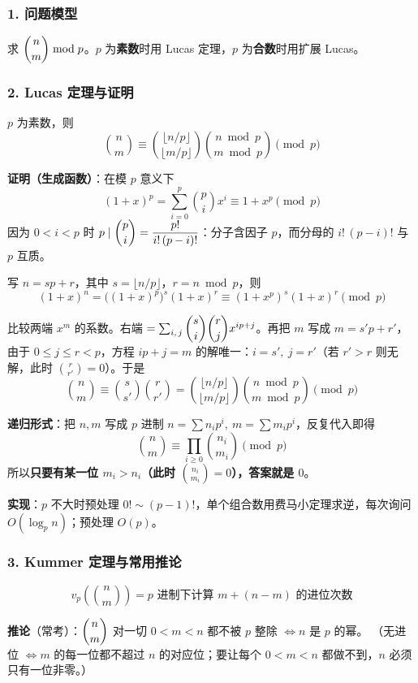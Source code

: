 \subsubsection*{1. 问题模型}

求 $\dbinom{n}{m} \bmod p$。$p$ 为\textbf{素数}时用 Lucas 定理，$p$ 为\textbf{合数}时用扩展 Lucas。

\hrulefill

\subsubsection*{2. Lucas 定理与证明}

$p$ 为素数，则
$$\boxed{\;\binom{n}{m} \equiv \binom{\lfloor n/p \rfloor}{\lfloor m/p \rfloor}\binom{n \bmod p}{m \bmod p} \pmod p\;}$$

\textbf{证明（生成函数）}：在模 $p$ 意义下
$$(1+x)^p = \sum_{i=0}^{p}\binom{p}{i}x^i \equiv 1 + x^p \pmod p$$
因为 $0 < i < p$ 时 $p \mid \dbinom{p}{i} = \dfrac{p!}{i!\,(p-i)!}$：分子含因子 $p$，而分母的 $i!\,(p-i)!$ 与 $p$ 互质。

写 $n = sp + r$，其中 $s = \lfloor n/p \rfloor$，$r = n \bmod p$，则
$$(1+x)^n = \big((1+x)^p\big)^s (1+x)^r \equiv (1+x^p)^s(1+x)^r \pmod p$$

比较两端 $x^m$ 的系数。右端 $= \sum_{i,\,j}\dbinom{s}{i}\dbinom{r}{j}x^{ip+j}$。再把 $m$ 写成 $m = s'p + r'$，
由于 $0 \le j \le r < p$，方程 $ip + j = m$ 的解唯一：$i = s',\ j = r'$（若 $r' > r$ 则无解，此时 $\binom{r}{r'}=0$）。于是
$$\binom{n}{m} \equiv \binom{s}{s'}\binom{r}{r'} = \binom{\lfloor n/p \rfloor}{\lfloor m/p \rfloor}\binom{n \bmod p}{m \bmod p} \pmod p$$

\textbf{递归形式}：把 $n, m$ 写成 $p$ 进制 $n = \sum n_i p^i,\ m = \sum m_i p^i$，反复代入即得
$$\binom{n}{m} \equiv \prod_{i \ge 0} \binom{n_i}{m_i} \pmod p$$
所以\textbf{只要有某一位 $m_i > n_i$（此时 $\binom{n_i}{m_i}=0$），答案就是 $0$}。

\textbf{实现}：$p$ 不大时预处理 $0!\sim(p-1)!$，单个组合数用费马小定理求逆，每次询问 $O(\log_p n)$；预处理 $O(p)$。

\hrulefill

\subsubsection*{3. Kummer 定理与常用推论}

$$\boxed{\;v_p\!\left(\binom{n}{m}\right) = \text{$p$ 进制下计算 } m + (n-m) \text{ 的进位次数}\;}$$

\textbf{推论}（常考）：$\dbinom{n}{m}$ 对一切 $0 < m < n$ 都不被 $p$ 整除 $\iff n$ 是 $p$ 的幂。
（无进位 $\iff m$ 的每一位都不超过 $n$ 的对应位；要让每个 $0<m<n$ 都做不到，$n$ 必须只有一位非零。）

